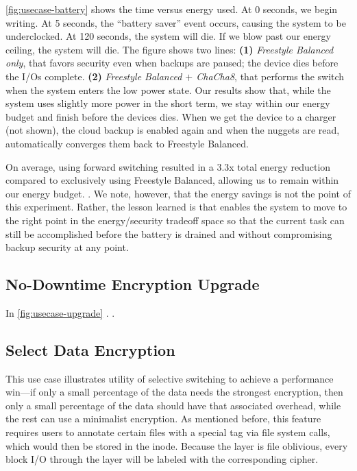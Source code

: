 \cref{fig:usecase-battery} shows the time versus energy used. At 0 seconds, we
begin writing. At 5 seconds, the ``battery saver'' event occurs, causing the
system to be underclocked. At 120 seconds, the system will die. If we blow past
our energy ceiling, the system will die. The figure shows two lines:
%
{\bf (1)} {\em Freestyle Balanced only}, that favors security even when backups
are paused; the device dies before the I/Os complete.
%
{\bf (2)} {\em Freestyle Balanced $+$ ChaCha8}, that performs the switch when
the system enters the low power state. Our results show that, while the system
uses slightly more power in the short term, we stay within our energy budget and
finish before the devices dies.
%
When we get the device to a charger (not shown), the cloud backup is enabled
again and when the nuggets are read, \sys automatically converges them back to
Freestyle Balanced.

On average, using forward switching resulted in a 3.3x total energy reduction
compared to exclusively using Freestyle Balanced, allowing us to remain within
our energy budget. . We note, however, that the energy savings is not
the point of this experiment. Rather, the lesson learned is that \sys enables
the system to move to the right point in the energy/security tradeoff space so
that the current task can still be accomplished before the battery is drained
and without compromising backup security at any point.


\subsection{No-Downtime Encryption Upgrade}\label{subsec:usecase-upgrade}



In \cref{fig:usecase-upgrade} . .


\subsection{Select Data Encryption}\label{subsec:usecase-agnostic}

This use case illustrates utility of selective switching to achieve a
performance win---if only a small percentage of the data needs the strongest
encryption, then only a small percentage of the data should have that associated
overhead, while the rest can use a minimalist encryption. As mentioned before,
this feature requires users to annotate certain files with a special tag via
file system calls, which would then be stored in the inode. Because the \sys
layer is file oblivious, every block I/O through the \sys layer will be labeled
with the corresponding cipher.

